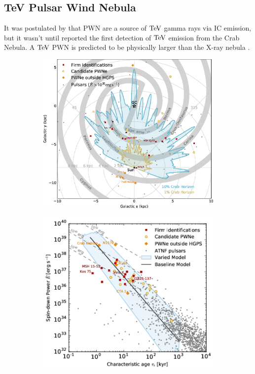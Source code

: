 \subsection{TeV Pulsar Wind Nebula} \label{sec:01_PWN_TeVPWN}

It was postulated by \cite{1965PhRvL..15..577G} that PWN are a source of $\TeV$ gamma rays via IC emission, but it wasn't until \cite{1989ApJ...342..379W} reported the first detection of $\TeV$ emission from the Crab Nebula. A $\TeV$ PWN is predicted to be physically larger than the X-ray nebula \citep{1997MNRAS.291..162A}.

\begin{figure}[h!]
	\centering
	\begin{subfigure}{0.495\textwidth}
	    \includegraphics[width=\linewidth]{04_Introduction/Images/pulsar_wind_nebula/TeV_PWN_location.eps}
	\end{subfigure}
	\hfill
	\begin{subfigure}{0.495\textwidth}
	    \includegraphics[width=\linewidth]{04_Introduction/Images/pulsar_wind_nebula/pulsar_spin_down_vs_age.png}

\end{subfigure}
\end{figure}
